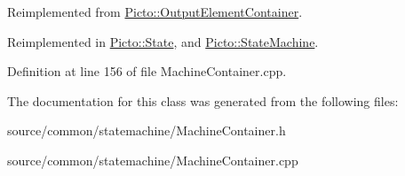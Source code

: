 Reimplemented from \hyperlink{class_picto_1_1_output_element_container_a0aa8ba5d35859292b2f3365f99c242c3}{Picto\-::\-Output\-Element\-Container}.



Reimplemented in \hyperlink{class_picto_1_1_state_a8e789d2395df4d047a278f3c09716468}{Picto\-::\-State}, and \hyperlink{class_picto_1_1_state_machine_a3b28ab6e5310ea16c2dbb19d6e071f80}{Picto\-::\-State\-Machine}.



Definition at line 156 of file Machine\-Container.\-cpp.



The documentation for this class was generated from the following files\-:\begin{DoxyCompactItemize}
\item 
source/common/statemachine/Machine\-Container.\-h\item 
source/common/statemachine/Machine\-Container.\-cpp\end{DoxyCompactItemize}
